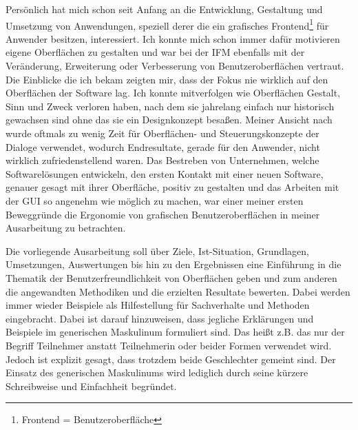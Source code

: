Persönlich hat mich schon seit Anfang an die Entwicklung, Gestaltung und Umsetzung von Anwendungen, speziell derer die ein grafisches Frontend\footnote{Frontend = Benutzeroberfläche} für Anwender besitzen, interessiert. Ich konnte mich schon immer dafür motivieren eigene Oberflächen zu gestalten und war bei der \gls{IFM} ebenfalls mit der Veränderung, Erweiterung oder Verbesserung von Benutzeroberflächen vertraut. Die Einblicke die ich bekam zeigten mir, dass der Fokus nie wirklich auf den Oberflächen der Software lag. Ich konnte mitverfolgen wie Oberflächen Gestalt, Sinn und Zweck verloren haben, nach dem sie jahrelang einfach nur historisch gewachsen sind ohne das sie ein Designkonzept besaßen. Meiner Ansicht nach wurde oftmals zu wenig Zeit für Oberflächen- und Steuerungskonzepte der Dialoge verwendet, wodurch Endresultate, gerade für den Anwender, nicht wirklich zufriedenstellend waren. Das Bestreben von Unternehmen, welche Softwarelösungen entwickeln, den ersten Kontakt mit einer neuen Software, genauer gesagt mit ihrer Oberfläche, positiv zu gestalten und das Arbeiten mit der \gls{GUI} so angenehm wie möglich zu machen, war einer meiner ersten Beweggründe die Ergonomie von grafischen Benutzeroberflächen in meiner Ausarbeitung zu betrachten. 

Die vorliegende Ausarbeitung soll über Ziele, Ist-Situation, Grundlagen, Umsetzungen, Auswertungen bis hin zu den Ergebnissen eine Einführung in die Thematik der Benutzerfreundlichkeit von Oberflächen geben und zum anderen die angewandten Methodiken und die erzielten Resultate bewerten. Dabei werden immer wieder Beispiele als Hilfestellung für Sachverhalte und Methoden eingebracht. Dabei ist darauf hinzuweisen, dass jegliche Erklärungen und Beispiele im generischen Maskulinum formuliert sind. Das heißt z.B. das nur der Begriff Teilnehmer anstatt Teilnehmerin oder beider Formen verwendet wird. Jedoch ist explizit gesagt, dass trotzdem beide Geschlechter gemeint sind. Der Einsatz des generischen Maskulinums wird lediglich durch seine kürzere Schreibweise und Einfachheit begründet.
